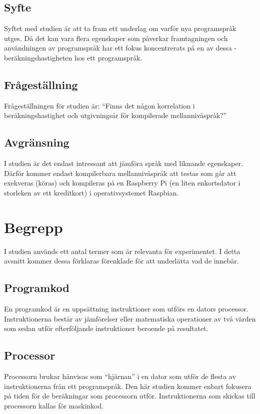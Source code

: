 \documentclass[12pt,swedish]{article}
\begin{document}
\subsection{Syfte}
Syftet med studien är att ta fram ett underlag om varför nya programspråk utges. Då det kan vara flera egenskaper som påverkar framtagningen och användningen av programspråk har ett fokus koncentrerats på en av dessa - beräkningshastigheten hos ett programspråk.

\subsection{Frågeställning}
Frågeställningen för studien är: “Finns det någon korrelation i beräkningshastighet och utgivningsår för kompilerade mellannivåspråk?”

\subsection{Avgränsning}
I studien är det endast intressant att jämföra språk med liknande egenskaper. Därför kommer endast kompilerbara mellannivåspråk att testas som går att exekveras (köras) och kompileras på en Raspberry Pi (en liten enkortsdator i storleken av ett kreditkort) i operativsystemet Raspbian.



\section{Begrepp}
I studien används ett antal termer som är relevanta för experimentet. I detta avsnitt kommer dessa förklaras förenklade för att underlätta vad de innebär.

\subsection{Programkod}
En programkod är en uppsättning instruktioner som utförs en dators processor. Instruktionerna består av jämförelser eller matematiska operationer av två värden som sedan utför efterföljande instruktioner beroende på resultatet.

\subsection{Processor}
Processorn brukar hänvisas som “hjärnan” i en dator som utför de flesta av instruktionerna från ett programspråk. Den här studien kommer enbart fokusera på tiden för de beräkningar som processorn utför. Instruktionerna som skickas till processorn kallas för maskinkod.
\end{document}
